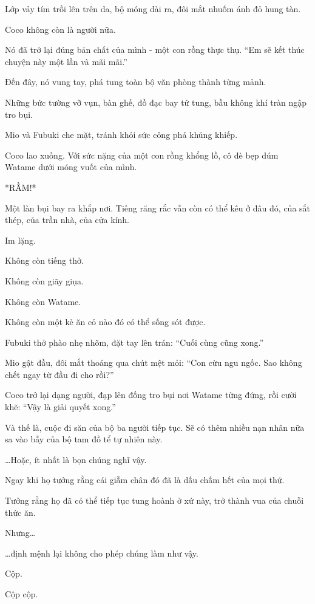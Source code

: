 \documentclass[../main.tex]{subfiles}
\begin{document}
Lớp vảy tím trồi lên trên da, bộ móng dài ra, đôi mắt nhuốm ánh đỏ hung tàn.

Coco không còn là người nữa.

Nó đã trở lại đúng bản chất của mình - một con rồng thực thụ. ``Em sẽ kết thúc chuyện này một lần và mãi mãi.''

Đến đây, nó vung tay, phá tung toàn bộ văn phòng thành từng mảnh.

Những bức tường vỡ vụn, bàn ghế, đồ đạc bay tứ tung, bầu không khí tràn ngập tro bụi.

Mio và Fubuki che mặt, tránh khỏi sức công phá khủng khiếp.

Coco lao xuống. Với sức nặng của một con rồng khổng lồ, cô đè bẹp dúm Watame dưới móng vuốt của mình.

*RẦM!*

Một làn bụi bay ra khắp nơi. Tiếng răng rắc vẫn còn có thể kêu ở đâu đó, của sắt thép, của trần nhà, của cửa kính.


Im lặng.

Không còn tiếng thở.

Không còn giãy giụa.

Không còn Watame.

Không còn một kẻ ăn cỏ nào đó có thể sống sót được.

Fubuki thở phào nhẹ nhõm, đặt tay lên trán: ``Cuối cùng cũng xong.''

Mio gật đầu, đôi mắt thoáng qua chút mệt mỏi: ``Con cừu ngu ngốc. Sao không chết ngay từ đầu đi cho rồi?''

Coco trở lại dạng người, đạp lên đống tro bụi nơi Watame từng đứng, rồi cười khẽ: ``Vậy là giải quyết xong.''

Và thế là, cuộc đi săn của bộ ba người tiếp tục. Sẽ có thêm nhiều nạn nhân nữa sa vào bẫy của bộ tam đồ tể tự nhiên này.
\omk

\dots Hoặc, ít nhất là bọn chúng nghĩ vậy.

Ngay khi họ tưởng rằng cái giẫm chân đó đã là dấu chấm hết của mọi thứ.

Tưởng rằng họ đã có thể tiếp tục tung hoành ở xứ này, trở thành vua của chuỗi thức ăn.

Nhưng\dots

\dots định mệnh lại không cho phép chúng làm như vậy.

Cộp.

Cộp cộp.
\end{document}
